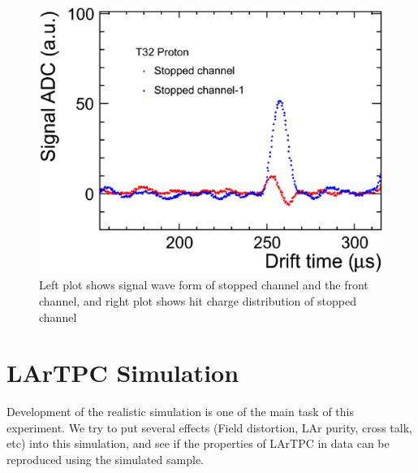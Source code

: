 \begin{figure}[htbp]
  \begin{center}
    \includegraphics[width=1.0\hsize,clip]{fig/cross_talk_1.eps}
  \end{center}
  \caption{Left plot shows signal wave form of stopped channel and the front channel, 
    and right plot shows hit charge distribution of stopped channel}
  \label{fig:cross_talk1}
  \label{fig:cross_talk2}
\end{figure}


\section{LArTPC Simulation}

Development of the realistic simulation is one of the main task of this experiment.
We try to put several effects (Field distortion, LAr purity, cross talk, etc) into this simulation,
and see if the properties of LArTPC in data can be reproduced using the simulated sample.

\label{Sec:Simulation}
